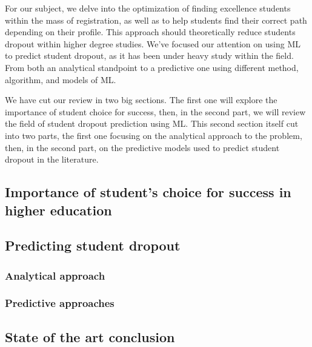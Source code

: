 \documentclass[../main.tex]{subfiles}
\begin{document}
For our subject, we delve into the optimization of finding excellence students within the mass of registration, as well as to help students find their correct path depending on their profile. This approach should theoretically reduce students dropout within higher degree studies.
We've focused our attention on using ML to predict student dropout, as it has been under heavy study within the field. From both an analytical standpoint to a predictive one using different method, algorithm, and models of ML.

We have cut our review in two big sections. The first one will explore the importance of student choice for success, then, in the second part, we will review the field of student dropout prediction using ML. This second section itself cut into two parts, the first one focusing on the analytical approach to the problem, then, in the second part, on the predictive models used to predict student dropout in the literature.

\subsection{Importance of student's choice for success in higher education}
\label{subsec:soa_importantestudentchoice}


\subsection{Predicting student dropout}
\label{subsec:soa_predictingstudentdropout}


\subsubsection{Analytical approach}
\label{subsubsec:soa_analyticalapproach}



\subsubsection{Predictive approaches}
\label{subsec:soa_predictiveapproach}


\vspace{8pt}
\subsection{State of the art conclusion}
\label{subsec:soa_cc}

\end{document}
